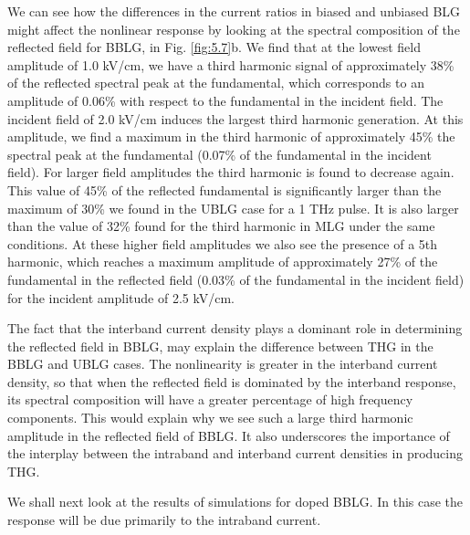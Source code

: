 \documentclass[twocolumn,secnumarabic,amssymb, nobibnotes, aps, prd, superscriptaddress]{revtex4-1}
\begin{document}
We can see how the differences in the current ratios in biased and unbiased BLG might affect the nonlinear response by looking at the spectral composition of the reflected field for BBLG, in Fig. \ref{fig:5.7}b. We find that at the lowest field amplitude of 1.0 kV/cm, we have a third harmonic signal of approximately 38\% of the reflected spectral peak at the fundamental, which corresponds
to an amplitude of 0.06\% with respect to the fundamental in the incident field. The incident field of 2.0 kV/cm induces the largest third harmonic generation. At this amplitude, we find a maximum in the third harmonic of approximately 45\% the spectral peak at the fundamental (0.07\% of the fundamental in the incident field). For larger field amplitudes the third harmonic is found to decrease again. This value of 45\% of the reflected fundamental is significantly larger than the maximum of 30\% we found in the UBLG case for a 1 THz pulse\cite{mcgouran2016nonlinear}. It is also larger than the value of 32\% found for the third harmonic in MLG under the same conditions\cite{al2014high}. At these higher field amplitudes we also see the presence of a 5th harmonic, which reaches a maximum amplitude of approximately 27\% of the fundamental in the reflected field  (0.03\% of the fundamental in the incident field) for the incident amplitude of 2.5 kV/cm.

The fact that the interband current density plays a dominant role in determining the reflected field in BBLG, may explain the difference between THG in the BBLG and UBLG cases. The nonlinearity is greater in the interband current density, so that when the reflected field is dominated by the interband response, its spectral composition will have a greater percentage of high frequency components. This would explain why we see such a large third harmonic amplitude in the reflected field of BBLG. It also underscores the importance of the interplay between the intraband and interband current densities in producing THG.

We shall next look at the results of simulations for doped BBLG. In this case the response will be due primarily to the intraband current.
\end{document}

